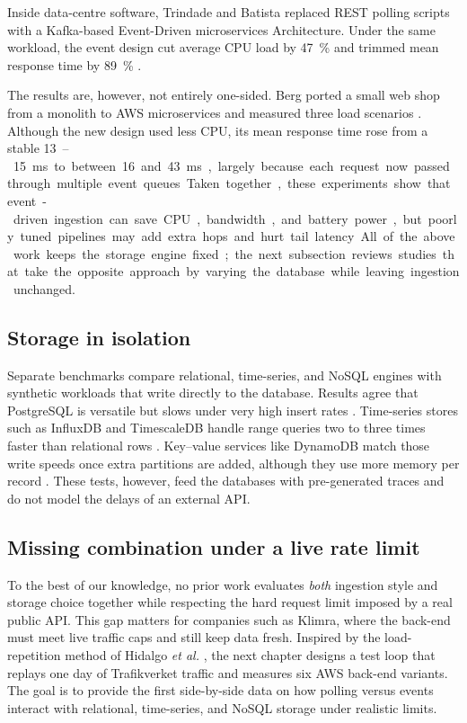 \documentclass[nomenclature, english, biblatex]{kththesis}
\numberwithin{listing}{chapter}
\begin{document}
Inside data-centre software, Trindade and Batista replaced REST polling scripts with a Kafka-based Event-Driven microservices Architecture.  
Under the same workload, the event design cut average CPU load by \SI{47}{\percent} and trimmed mean response time by \SI{89}{\percent} \cite{Trindade2021EDAImpact}.

The results are, however, not entirely one-sided.  
Berg ported a small web shop from a monolith to AWS microservices and measured three load scenarios \cite{Berg2022MonolithVsMicroservices}.  
Although the new design used less CPU, its mean response time rose from a stable \SI{13}–\SI{15}{\milli\second} to between \SI{16} and \SI{43}{\milli\second}, largely because each request now passed through multiple event queues.

Taken together, these experiments show that event-driven ingestion can save CPU, bandwidth, and battery power, but poorly tuned pipelines may add extra hops and hurt tail latency.  
All of the above work keeps the storage engine fixed; the next subsection reviews studies that take the opposite approach by varying the database while leaving ingestion unchanged.


\subsection{Storage in isolation}
Separate benchmarks compare relational, time-series, and NoSQL engines with
synthetic workloads that write directly to the database.  
Results agree that PostgreSQL is versatile but slows under very high
insert rates \cite{Heldt2021SciTS}.  
Time-series stores such as InfluxDB and TimescaleDB handle range queries
two to three times faster than relational rows
\cite{Grzesik2020EdgeIoTBenchmark,Daqouri2023TimeseriesVsSQL}.  
Key–value services like DynamoDB match those write speeds once extra
partitions are added, although they use more memory per record
\cite{Vergara2021PerformanceTSDB,Zhang2023EdgeTSDB}.  
These tests, however, feed the databases with pre-generated traces and do
not model the delays of an external API.

\subsection{Missing combination under a live rate limit}
To the best of our knowledge, no prior work evaluates \emph{both} ingestion
style and storage choice together while respecting the hard request limit
imposed by a real public API.  
This gap matters for companies such as Klimra, where the back-end must meet
live traffic caps and still keep data fresh.  
Inspired by the load-repetition method of Hidalgo \textit{et al.}
\cite{Hidalgo2023StreamProcMicroservices}, the next chapter designs a test
loop that replays one day of Trafikverket traffic and measures six AWS
back-end variants.  The goal is to provide the first side-by-side data on
how polling versus events interact with relational, time-series, and
NoSQL storage under realistic limits.
\end{document}
